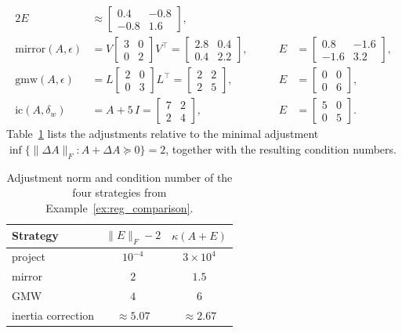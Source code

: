 \documentclass[class=scrbook, crop=false]{standalone}
\begin{document}
\begin{example}
\begin{alignat*}{2}
    E &\approx \begin{bmatrix} 0.4 & -0.8 \\ -0.8 & 1.6 \end{bmatrix}, \\
    \mathrm{mirror}(A,\epsilon) &= V \begin{bmatrix} 3 & 0 \\ 0 & 2 \end{bmatrix} V^\top
        = \begin{bmatrix} 2.8 & 0.4 \\ 0.4 & 2.2 \end{bmatrix}, &\qquad
    E &= \begin{bmatrix} 0.8 & -1.6 \\ -1.6 & 3.2 \end{bmatrix}, \\
    \mathrm{gmw}(A,\epsilon) &= L \begin{bmatrix} 2 & 0 \\ 0 & 3 \end{bmatrix} L^\top
        = \begin{bmatrix} 2 & 2 \\ 2 & 5 \end{bmatrix}, &\qquad
    E &= \begin{bmatrix} 0 & 0 \\ 0 & 6 \end{bmatrix}, \\
    \mathrm{ic}(A,\delta_w) &= A + 5\, I
        = \begin{bmatrix} 7 & 2 \\ 2 & 4 \end{bmatrix}, &\qquad
    E &= \begin{bmatrix} 5 & 0 \\ 0 & 5 \end{bmatrix}.
\end{alignat*}
Table~\ref{tab:reg_example} lists the adjustments relative 
to the minimal adjustment $\inf\{\|\Delta A\|_F : A + \Delta A \succeq 0\} = 2$, 
together with the resulting condition numbers.
\begin{table}[htbp]
\centering
\caption{Adjustment norm and condition number of the four strategies from Example~\ref{ex:reg_comparison}.}
\label{tab:reg_example}
\vspace{0.5em}
\begin{tabular}{lcc}
    \toprule
    Strategy & $\|E\|_F - 2$ & $\kappa(A+E)$ \\
    \midrule
    project            & $10^{-4}$      & $3\times10^{4}$ \\
    mirror             & $2$            & $1.5$ \\
    \gls{GMW}          & $4$            & $6$ \\
    inertia correction & $\approx 5.07$ & $\approx 2.67$ \\
    \bottomrule
\end{tabular}
\end{table}


\end{example}
\end{document}
